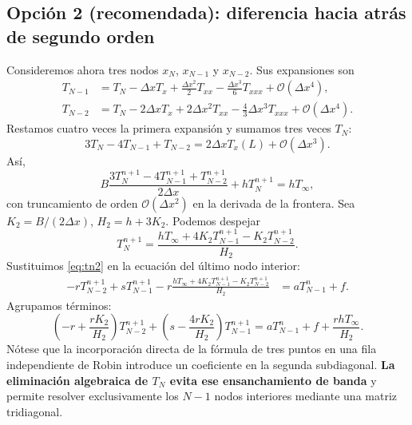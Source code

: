 \documentclass[11pt,a4paper]{article}
\newcommand{\OO}{\mathcal{O}}
\begin{document}
\subsection{Opción 2 (recomendada): diferencia hacia atrás de segundo orden}
Consideremos ahora tres nodos $x_N$, $x_{N-1}$ y $x_{N-2}$. Sus expansiones son
\begin{align}
T_{N-1}&=T_N-\Delta x T_x+\frac{\Delta x^2}{2}T_{xx}-\frac{\Delta x^3}{6}T_{xxx}+\OO(\Delta x^4),\\
T_{N-2}&=T_N-2\Delta x T_x+2\Delta x^2T_{xx}-\frac{4}{3}\Delta x^3T_{xxx}+\OO(\Delta x^4).
\end{align}
Restamos cuatro veces la primera expansión y sumamos tres veces $T_N$:
\begin{equation}
3T_N-4T_{N-1}+T_{N-2}=2\Delta x T_x(L)+\OO(\Delta x^3).
\end{equation}
Así,
\begin{equation}\label{eq:robin2}
B\frac{3T_N^{n+1}-4T_{N-1}^{n+1}+T_{N-2}^{n+1}}{2\Delta x}
+hT_N^{n+1}=hT_\infty,
\end{equation}
con truncamiento de orden $\OO(\Delta x^2)$ en la derivada de la frontera. Sea $K_2=B/(2\Delta x)$, $H_2=h+3K_2$. Podemos despejar
\begin{equation}\boxed{T_N^{n+1}=\frac{hT_\infty+4K_2T_{N-1}^{n+1}-K_2T_{N-2}^{n+1}}{H_2}.}\label{eq:tn2}\end{equation}
Sustituimos \eqref{eq:tn2} en la ecuación del último nodo interior:
\begin{align}
-rT_{N-2}^{n+1}+sT_{N-1}^{n+1}
-r\frac{hT_\infty+4K_2T_{N-1}^{n+1}-K_2T_{N-2}^{n+1}}{H_2}
&=aT_{N-1}^n+f.
\end{align}
Agrupamos términos:
\begin{equation}\boxed{
\left(-r+\frac{rK_2}{H_2}\right)T_{N-2}^{n+1}
+\left(s-\frac{4rK_2}{H_2}\right)T_{N-1}^{n+1}
=aT_{N-1}^n+f+\frac{rhT_\infty}{H_2}.}
\label{eq:last2}
\end{equation}
Nótese que la incorporación directa de la fórmula de tres puntos en una fila independiente de Robin introduce un coeficiente en la segunda subdiagonal. \textbf{La eliminación algebraica de $T_N$ evita ese ensanchamiento de banda} y permite resolver exclusivamente los $N-1$ nodos interiores mediante una matriz tridiagonal.
\end{document}
